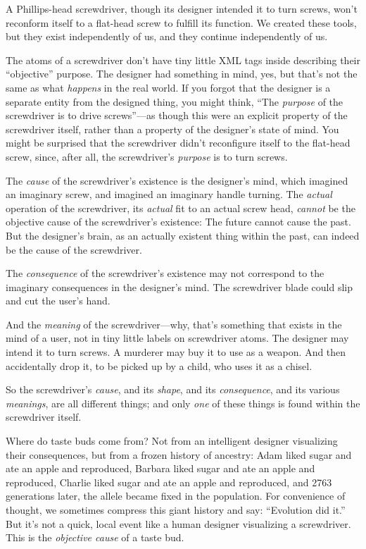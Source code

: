 {
 A Phillips-head screwdriver, though its designer intended it to
turn screws, won't reconform itself to a flat-head
screw to fulfill its function. We created these tools, but they exist
independently of us, and they continue independently of us.}

{
 The atoms of a screwdriver don't have tiny little
XML tags inside describing their
``objective'' purpose. The designer
had something in mind, yes, but that's not the same as
what \textit{happens} in the real world. If you forgot that the
designer is a separate entity from the designed thing, you might think,
``The \textit{purpose} of the screwdriver is to drive
screws''---as though this were an explicit property
of the screwdriver itself, rather than a property of the
designer's state of mind. You might be surprised that
the screwdriver didn't reconfigure itself to the
flat-head screw, since, after all, the screwdriver's
\textit{purpose} is to turn screws.}

{
 The \textit{cause} of the screwdriver's existence
is the designer's mind, which imagined an imaginary
screw, and imagined an imaginary handle turning. The \textit{actual}
operation of the screwdriver, its \textit{actual} fit to an actual
screw head, \textit{cannot} be the objective cause of the
screwdriver's existence: The future cannot cause the
past. But the designer's brain, as an actually existent
thing within the past, can indeed be the cause of the screwdriver.}

{
 The \textit{consequence} of the screwdriver's
existence may not correspond to the imaginary consequences in the
designer's mind. The screwdriver blade could slip and
cut the user's hand.}

{
 And the \textit{meaning} of the screwdriver---why,
that's something that exists in the mind of a user, not
in tiny little labels on screwdriver atoms. The designer may intend it
to turn screws. A murderer may buy it to use as a weapon. And then
accidentally drop it, to be picked up by a child, who uses it as a
chisel.}

{
 So the screwdriver's \textit{cause}, and its
\textit{shape}, and its \textit{consequence}, and its various
\textit{meanings}, are all different things; and only \textit{one} of
these things is found within the screwdriver itself.}

{
 Where do taste buds come from? Not from an intelligent designer
visualizing their consequences, but from a frozen history of ancestry:
Adam liked sugar and ate an apple and reproduced, Barbara liked sugar
and ate an apple and reproduced, Charlie liked sugar and ate an apple
and reproduced, and 2763 generations later, the allele became fixed in
the population. For convenience of thought, we sometimes compress this
giant history and say: ``Evolution did
it.'' But it's not a quick, local
event like a human designer visualizing a screwdriver. This is the
\textit{objective cause} of a taste bud.}

